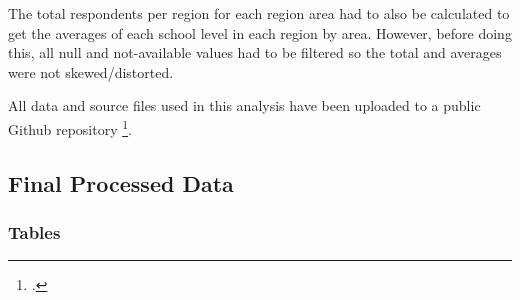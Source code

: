\documentclass[stu, 12pt, floatsintext,longtable]{apa7}
\begin{document}
The total respondents per region for each region area had to also be calculated
to
get the
averages of each school level in each region by area. However, before doing
this,
all null and not-available values had to be filtered so the total and averages
were not skewed/distorted.

All data and source files used in this analysis have been uploaded to a public
Github repository \footcite{githubdata}.

\newpage
\subsection{Final Processed Data}
\subsubsection{Tables}
\end{document}
